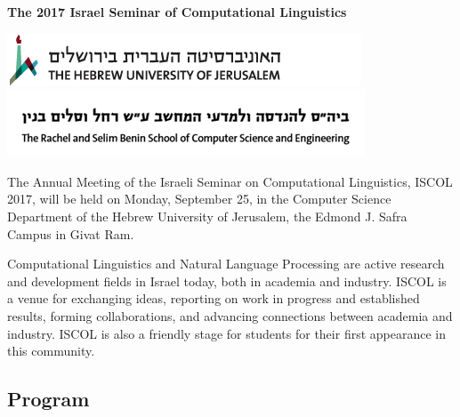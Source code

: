 \documentclass[a0,portrait]{a0poster}
\begin{document}

\begin{center}
	\veryHuge \color{NavyBlue} \textbf{The 2017 Israel Seminar of Computational
Linguistics}
\end{center}

\vspace{1cm} %
\titlespacing*{\section}{0pt}{8mm}{5mm}

\includegraphics{img/huji_banner.png}
\includegraphics{img/cse_banner.png}

The Annual Meeting of the Israeli Seminar on Computational Linguistics,
ISCOL 2017, will be held on Monday, September 25, in the Computer
Science Department of the Hebrew University of Jerusalem, the Edmond J.
Safra Campus in Givat Ram.


Computational Linguistics and Natural Language Processing are active
research and development fields in Israel today, both in academia and
industry. ISCOL is a venue for exchanging ideas, reporting on work in
progress and established results, forming collaborations, and advancing
connections between academia and industry. ISCOL is also a friendly
stage for students for their first appearance in this community.

\subsection*{Program}\label{program}
\end{document}
